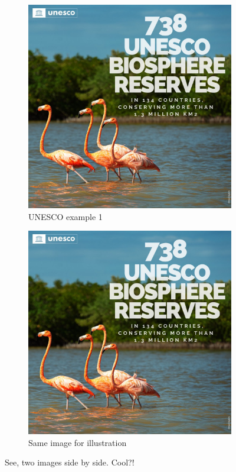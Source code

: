 \begin{figure}[H]
	\centering
	\begin{subfigure}{.5\textwidth}
	  \centering
	  \includegraphics[width=.9\linewidth]{example-unesco.jpg}
	  \caption{UNESCO example 1}
	  \label{fig:sub1}
	\end{subfigure}%
	\begin{subfigure}{.5\textwidth}
	  \centering
	  \includegraphics[width=.9\linewidth]{example-unesco.jpg}
	  \caption{Same image for illustration}
	  \label{fig:sub2}
	\end{subfigure}
	\caption{See, two images side by side. Cool?!}
	\label{fig:test}
\end{figure}



